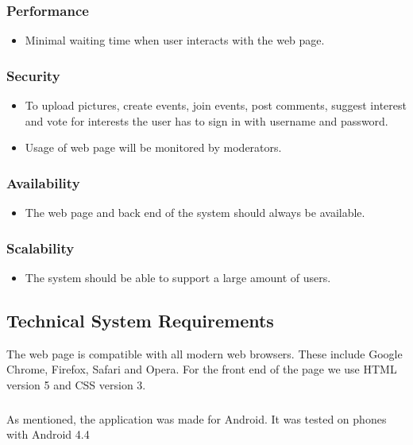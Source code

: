 \subsubsection{Performance}
\begin{itemize}
    \item Minimal waiting time when user interacts with the web page.
\end{itemize}

\subsubsection{Security}
\begin{itemize}
    \item To upload pictures, create events, join events, post comments, suggest interest and vote for interests the user has to sign in with username and password.
    \item Usage of web page will be monitored by moderators.
\end{itemize}

\subsubsection{Availability}
\begin{itemize}
    \item The web page and back end of the system should always be available.
\end{itemize}

\subsubsection{Scalability}
\begin{itemize}
    \item The system should be able to support a large amount of users.
\end{itemize}

\subsection{Technical System Requirements}
\label{subsec:SysReqReqsTechnical}
The web page is compatible with all modern web browsers. These include Google Chrome, Firefox, Safari and Opera. For the front end of the page we use HTML version 5 and CSS version 3.

\subparagraph{} As mentioned, the application was made for Android. It was tested on phones with Android 4.4

